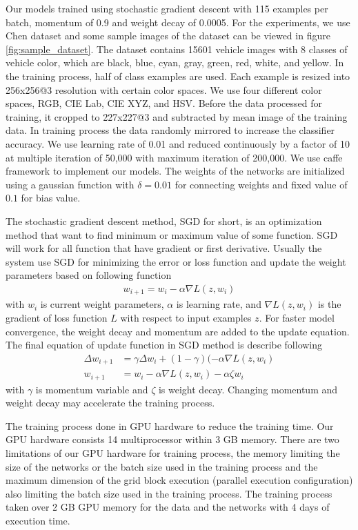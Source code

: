 \documentclass[conference]{IEEEtran}
\begin{document}
Our models trained using stochastic gradient descent with 115 examples per batch, momentum of 0.9 and weight decay of 0.0005. For the experiments, we use Chen dataset \cite{pchen} and some sample images of the dataset can be viewed in figure \ref{fig:sample_dataset}. The dataset contains 15601 vehicle images with 8 classes of vehicle color, which are black, blue, cyan, gray, green, red, white, and yellow. In the training process, half of class examples are used. Each example is resized into 256x256@3 resolution with certain color spaces. We use four different color spaces, RGB, CIE Lab, CIE XYZ, and HSV. Before the data processed for training, it cropped to 227x227@3 and subtracted by mean image of the training data. In training process the data randomly mirrored to increase the classifier accuracy. We use learning rate of 0.01 and reduced continuously by a factor of 10 at multiple iteration of 50,000 with maximum iteration of 200,000. We use caffe framework \cite{caffe} to implement our models. The weights of the networks are initialized using a gaussian function with $\delta=0.01$ for connecting weights and fixed value of $0.1$ for bias value. 

The stochastic gradient descent method, SGD for short, is an optimization method that want to find minimum or maximum value of some function. SGD will work for all function that have gradient or first derivative. Usually the system use SGD for minimizing the error or loss function and update the weight parameters based on following function
\begin{align}
	w_{i+1} = w_i - \alpha\nabla L(z,w_i)
\end{align} 
with $w_i$ is current weight parameters, $\alpha$ is learning rate, and $\nabla L(z,w_i)$ is the gradient of loss function $L$ with respect to input examples $z$. For faster model convergence, the weight decay and momentum are added to the update equation. The final equation of update function in SGD method is describe following
\begin{align}
	\Delta w_{i+1} &= \gamma \Delta w_i + (1-\gamma)(-\alpha\nabla L(z,w_i) \\
	w_{i+1} &= w_i - \alpha\nabla L(z,w_i) - \alpha\zeta w_i
\end{align}
with $\gamma$ is momentum variable and $\zeta$ is weight decay. Changing momentum and weight decay may accelerate the training process.

The training process done in GPU hardware to reduce the training time. Our GPU hardware consists 14 multiprocessor within 3 GB memory. There are two limitations of our GPU hardware for training process, the memory limiting the size of the networks or the batch size used in the training process and the maximum dimension of the grid block execution (parallel execution configuration) also limiting the batch size used in the training process. The training process taken over 2 GB GPU memory for the data and the networks with 4 days of execution time.
\end{document}
